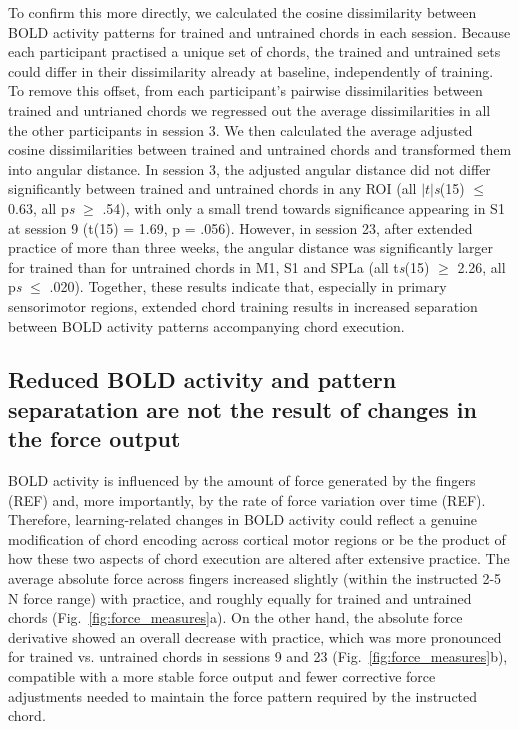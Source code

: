 \documentclass{article}
\begin{document}
To confirm this more directly, we calculated the cosine dissimilarity between BOLD activity patterns for trained and untrained chords in each session. Because each participant practised a unique set of chords, the trained and untrained sets could differ in their dissimilarity already at baseline, independently of training. To remove this offset, from each participant's pairwise dissimilarities between trained and untrianed chords we regressed out the average dissimilarities in all the other participants in session 3. We then calculated the average adjusted cosine dissimilarities between trained and untrained chords and transformed them into angular distance. In session 3, the adjusted angular distance did not differ significantly between trained and untrained chords in any ROI (all $|t|$\textit{s}(15) $\leq$ 0.63, all p\textit{s} $\geq$ .54), with only a small trend towards significance appearing in S1 at session 9 (t(15) = 1.69, p = .056). However, in session 23, after extended practice of more than three weeks, the angular distance was significantly larger for trained than for untrained chords in M1, S1 and SPLa (all t\textit{s}(15) $\geq$ 2.26, all p\textit{s} $\leq$ .020). Together, these results indicate that, especially in primary sensorimotor regions, extended chord training results in increased separation between BOLD activity patterns accompanying chord execution.


\subsection{Reduced BOLD activity and pattern separatation are not the result of changes in the force output}
BOLD activity is influenced by the amount of force generated by the fingers (REF) and, more importantly, by the rate of force variation over time (REF). Therefore, learning-related changes in BOLD activity could reflect a genuine modification of chord encoding across cortical motor regions or be the product of how these two aspects of chord execution are altered after extensive practice. The average absolute force across fingers increased slightly (within the instructed 2-5 N force range) with practice, and roughly equally for trained and untrained chords (Fig.~\ref{fig:force_measures}a). On the other hand, the absolute force derivative showed an overall decrease with practice, which was more pronounced for trained vs. untrained chords in sessions 9 and 23 (Fig.~\ref{fig:force_measures}b), compatible with a more stable force output and fewer corrective force adjustments needed to maintain the force pattern required by the instructed chord.\\
\end{document}

